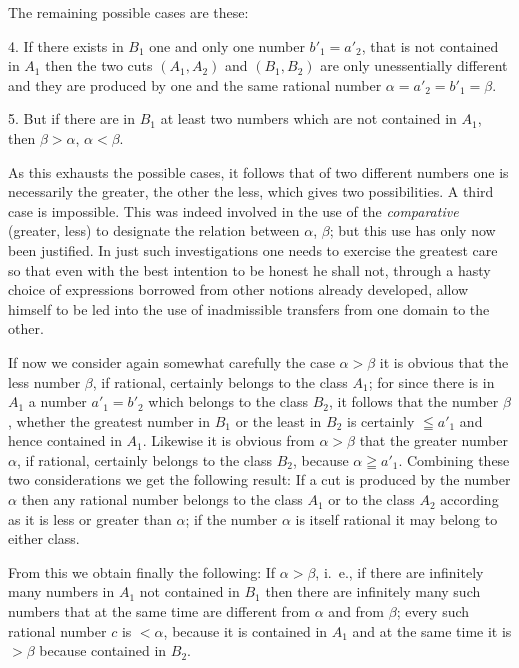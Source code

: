 \documentclass[twoside,openright]{article}
\begin{document}
The remaining possible cases are these:

4. If there exists in $B_1$ one and only one number $b'_1 = a'_2$,
that is not contained in $A_1$ then the two cuts $(A_1, A_2)$ and
$(B_1, B_2)$ are only unessentially different and they are produced by
one and the same rational number $\alpha = a'_2 = b'_1 = \beta$.

5. But if there are in $B_1$ at least two numbers which are not
contained in $A_1$, then $\beta > \alpha$, $\alpha < \beta$.

As this exhausts the possible cases, it follows that of two different
numbers one is necessarily the greater, the other the less, which
gives two possibilities. A third case is impossible. This was indeed
involved in the use of the \textit{comparative} (greater, less) to
designate the relation between $\alpha$, $\beta$; but this use has
only now been justified. In just such investigations one needs to
exercise the greatest care so that even with the best intention to be
honest he shall not, through a hasty choice of expressions borrowed
from other notions already developed, allow himself to be led into the
use of inadmissible transfers from one domain to the other.

If now we consider again somewhat carefully the case $\alpha>\beta$ it
is obvious that the less number $\beta$, if rational, certainly
belongs to the class $A_1$; for since there is in $A_1$ a number
$a'_1=b'_2$ which belongs to the class $B_2$, it follows that the
number $\beta$, whether the greatest number in $B_1$ or the least in
$B_2$ is certainly $\leqq a'_1$ and hence contained in $A_1$. Likewise
it is obvious from $\alpha>\beta$ that the greater number $\alpha$, if
rational, certainly belongs to the class $B_2$, because
$\alpha \geqq a'_1$. Combining these two considerations we get the
following result: If a cut is produced by the number $\alpha$ then any
rational number belongs to the class $A_1$ or to the class $A_2$
according as it is less or greater than $\alpha$; if the number
$\alpha$ is itself rational it may belong to either class.

From this we obtain finally the following: If $\alpha>\beta$, i.~e.,
if there are infinitely many numbers in $A_1$ not contained in $B_1$
then there are infinitely many such numbers that at the same time are
different from $\alpha$ and from $\beta$; every such rational number
$c$ is $<\alpha$, because it is contained in $A_1$ and at the same
time it is $>\beta$ because contained in $B_2$.
\end{document}
